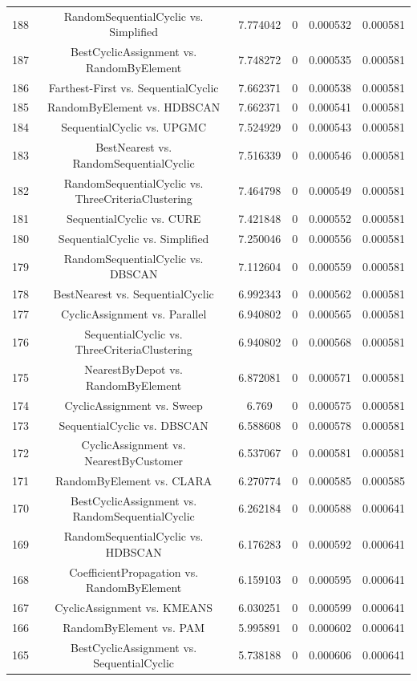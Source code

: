 \documentclass[a4paper,10pt]{article}
\begin{document}
\begin{landscape}
\begin{table}[!htp]
\begin{tabular}{cccccc}
188&RandomSequentialCyclic vs. Simplified&7.774042&0&0.000532&0.000581\\
187&BestCyclicAssignment vs. RandomByElement&7.748272&0&0.000535&0.000581\\
186&Farthest-First vs. SequentialCyclic&7.662371&0&0.000538&0.000581\\
185&RandomByElement vs. HDBSCAN&7.662371&0&0.000541&0.000581\\
184&SequentialCyclic vs. UPGMC&7.524929&0&0.000543&0.000581\\
183&BestNearest vs. RandomSequentialCyclic&7.516339&0&0.000546&0.000581\\
182&RandomSequentialCyclic vs. ThreeCriteriaClustering&7.464798&0&0.000549&0.000581\\
181&SequentialCyclic vs. CURE&7.421848&0&0.000552&0.000581\\
180&SequentialCyclic vs. Simplified&7.250046&0&0.000556&0.000581\\
179&RandomSequentialCyclic vs. DBSCAN&7.112604&0&0.000559&0.000581\\
178&BestNearest vs. SequentialCyclic&6.992343&0&0.000562&0.000581\\
177&CyclicAssignment vs. Parallel&6.940802&0&0.000565&0.000581\\
176&SequentialCyclic vs. ThreeCriteriaClustering&6.940802&0&0.000568&0.000581\\
175&NearestByDepot vs. RandomByElement&6.872081&0&0.000571&0.000581\\
174&CyclicAssignment vs. Sweep&6.769&0&0.000575&0.000581\\
173&SequentialCyclic vs. DBSCAN&6.588608&0&0.000578&0.000581\\
172&CyclicAssignment vs. NearestByCustomer&6.537067&0&0.000581&0.000581\\
171&RandomByElement vs. CLARA&6.270774&0&0.000585&0.000585\\
170&BestCyclicAssignment vs. RandomSequentialCyclic&6.262184&0&0.000588&0.000641\\
169&RandomSequentialCyclic vs. HDBSCAN&6.176283&0&0.000592&0.000641\\
168&CoefficientPropagation vs. RandomByElement&6.159103&0&0.000595&0.000641\\
167&CyclicAssignment vs. KMEANS&6.030251&0&0.000599&0.000641\\
166&RandomByElement vs. PAM&5.995891&0&0.000602&0.000641\\
165&BestCyclicAssignment vs. SequentialCyclic&5.738188&0&0.000606&0.000641\\

\end{tabular}
\end{table}
\end{landscape}
\end{document}
